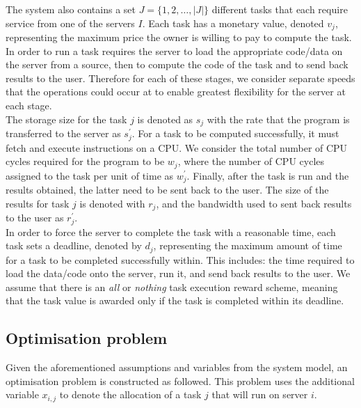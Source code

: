 The system also contains a set $J = \{1,2,\ldots,\left| J \right|\}$ different tasks that each require service from one
of the servers $I$. Each task has a monetary value, denoted $v_j$,
representing the maximum price the owner is willing to pay to compute the task. \\
In order to run a task requires the server to load the appropriate code/data on the server from a source, then to
compute the code of the task and to send back results to the user. Therefore for each of these stages, we consider
separate speeds that the operations could occur at to enable greatest flexibility for the server at each stage. \\
The storage size for the task $j$ is denoted as $s_j$ with the rate that the program is transferred to the server
as $s^{'}_j$. For a task to be computed successfully, it must fetch and execute instructions on a CPU. We consider the
total number of CPU cycles required for the program to be $w_j$, where the number of CPU cycles assigned to the task
per unit of time as $w^{'}_j$. Finally, after the task is run and the results obtained, the latter need to be sent back
to the user. The size of the results for task $j$ is denoted with $r_j$, and the bandwidth used to sent back results to
the user as $r^{'}_j$. \\
In order to force the server to complete the task with a reasonable time, each task sets a deadline, denoted by $d_j$,
representing the maximum amount of time for a task to be completed successfully within. This includes: the time
required to load the data/code onto the server, run it, and send back results to the user. We assume that there
is an \emph{all} or \emph{nothing} task execution reward scheme, meaning that the task value is awarded only if the
task is completed within its deadline.

\subsection{Optimisation problem}
\label{subsec:optimisation-problem}
Given the aforementioned assumptions and variables from the system model, an optimisation problem is constructed as
followed. This problem uses the additional variable $x_{i,j}$ to denote the allocation of a task $j$ that will run on
server $i$.

